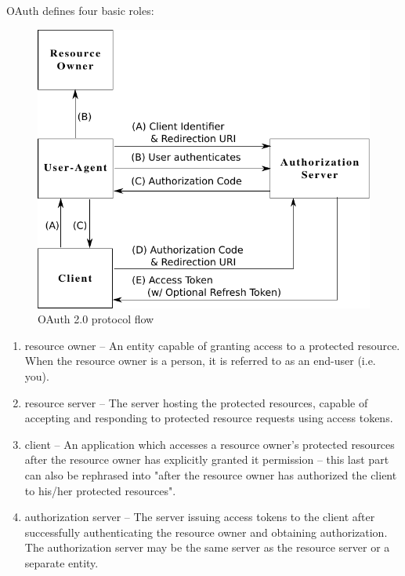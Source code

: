 \documentclass[a4paper]{llncs}
\begin{document}
OAuth defines four basic roles: 

\begin{figure}[htb]
  \centering
  \includegraphics[width=\textwidth]{Oauth2.pdf}
  \caption{OAuth 2.0 protocol flow}
  \label{fig:oauth2flow}
\end{figure}

\begin{enumerate}
\item resource owner -- An entity capable of granting access to a protected resource. When the resource owner is a person, it is referred to as an end-user (i.e. you).

\item resource server -- The server hosting the protected resources, capable of accepting and responding to protected resource requests using access tokens.

\item client -- An application which accesses a resource owner's protected resources after the resource owner has explicitly granted it permission -- this last part can also be rephrased into "after the resource owner has authorized the client to his/her protected resources".

\item authorization server -- The server issuing access tokens to the client after successfully authenticating the resource owner and obtaining authorization. The authorization server may be the same server as the resource server or a separate entity.
\end{enumerate}
\end{document}
